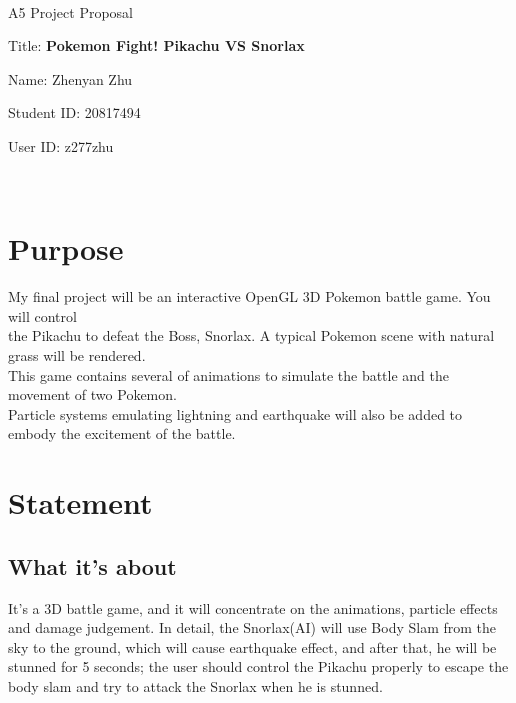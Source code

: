\documentclass {article}
\begin{document}
~\vfill
\begin{center}
\Large

A5 Project Proposal

Title: \textbf{Pokemon Fight! Pikachu VS Snorlax}

Name: Zhenyan Zhu

Student ID: 20817494

User ID: z277zhu
\end{center}
\vfill ~\vfill~
\newpage
\section{Purpose}
	My final project will be an interactive OpenGL 3D Pokemon battle game. You will control \\
    the Pikachu to defeat the Boss, Snorlax. A typical Pokemon scene with natural grass will be rendered. \\
    This game contains several of animations to simulate the battle and the movement of two Pokemon. \\ 
    Particle systems emulating lightning and earthquake will also be added to embody the excitement of the battle.

\section{Statement}
    \subsection{What it's about}
        It's a 3D battle game, and it will concentrate on the animations, particle effects and damage judgement. In detail,
        the Snorlax(AI) will use Body Slam from the sky to the ground, which will cause earthquake effect, and after that, he will be stunned for
        5 seconds; the user should control the Pikachu properly to escape the body slam and try to attack the Snorlax when he is stunned.
\end{document}
